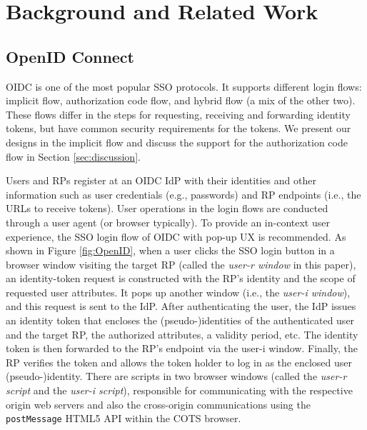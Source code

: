 \section{Background and Related Work}
\label{sec:background}

\subsection{OpenID Connect}
\label{subsec:OIDC}
OIDC is one of the most popular SSO protocols. It supports different login flows: implicit flow, authorization code flow, and hybrid flow (a mix of the other two).
These flows differ in the steps for requesting, receiving and forwarding identity tokens, but have common security requirements for the tokens.
We present our designs in the implicit flow and discuss the support for the authorization code flow in Section \ref{sec:discussion}.

Users and RPs register at an OIDC IdP with their identities
and other information such as user credentials (e.g., passwords)
and RP endpoints (i.e., the URLs to receive tokens).
User operations in the login flows are conducted through a user agent (or browser typically).
To provide an in-context user experience,
    the SSO login flow of OIDC with pop-up UX \cite{dimvaLiM16,GoogleIdIntegrate,uber} is recommended.
As shown in Figure \ref{fig:OpenID},
when a user clicks the SSO login button in a browser window visiting the target RP 
(called the \emph{user-r window} in this paper),
 an identity-token request is constructed with the RP's identity and the scope of requested user attributes.
It pops up another window (i.e., the \emph{user-i window}),
    and this request is sent to the IdP.
After authenticating the user, the IdP issues an identity token that encloses the (pseudo-)identities of the authenticated user and the target RP, the authorized attributes, a validity period, etc.
The identity token is then forwarded to the RP's endpoint via the user-i window.
Finally, the RP verifies the token and allows the token holder to log in as the enclosed user (pseudo-)identity.
There are scripts in two browser windows (called the \emph{user-r script} and the \emph{user-i script}),
    responsible for communicating with the respective origin web servers
    and also the cross-origin
communications using the \verb+postMessage+ HTML5 API within the COTS browser.



